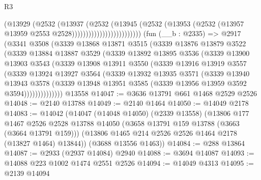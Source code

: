 \begin{lexlean}{R3}
\begin{coremodule}
                                    (@13929
                                      (@2532
                                        (@13937
                                          (@2532
                                            (@13945
                                              (@2532
                                                (@13953
                                                  (@2532
                                                    (@13957
                                                      @13959
                                                      @2553
                                                      @2528)))))))))))))))))))))))))
    (fun (__b : @2335) =>
    @2917
      (@3341
        @3508
        (@3339
          @13868
          @13871
          @3515
          (@3339
            @13876
            @13879
            @3522
            (@3339
              @13884
              @13887
              @3529
              (@3339
                @13892
                @13895
                @3536
                (@3339
                  @13900
                  @13903
                  @3543
                  (@3339
                    @13908
                    @13911
                    @3550
                    (@3339
                      @13916
                      @13919
                      @3557
                      (@3339
                        @13924
                        @13927
                        @3564
                        (@3339
                          @13932
                          @13935
                          @3571
                          (@3339
                            @13940
                            @13943
                            @3578
                            (@3339
                              @13948
                              @13951
                              @3585
                              (@3339 @13956 @13959 @3592 @3594))))))))))))))
    @13558
@14047 := @3636 @13791 @661 @1468 @2529 @2526
@14048 := @2140 @13788
@14049 := @2140 @1464
@14050 := @14049 @2178
@14083 := @14042
    (@14047
      (@14048 @14050)
      (@2339 @13558)
      (@13806
        @177
        @1467
        @2526
        @2528
        @13788
        @14050
        (@3658 @13791 @159 @13788 (@3663 (@3664 @13791 @159)))
        (@13806 @1465 @214 @2526 @2526 @1464 @2178 (@13827 @1464) @13844))
      (@3688 @13556 @1463))
@14084 := @288 @13864
@14087 := @2933 (@2937 @14084) @2940
@14088 := @3694 @14087
@14093 := @14088 @223 @1002 @1474 @2551 @2526
@14094 := @14049 @4313
@14095 := @2139 @14094

\end{coremodule}
\end{lexlean}
